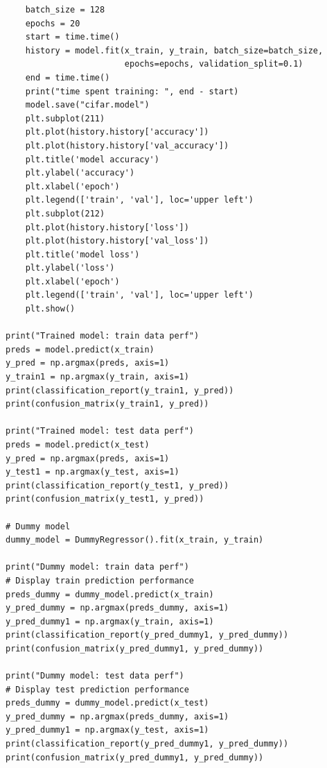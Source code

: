 \documentclass[10pt]{article}
\begin{document}
\begin{lstlisting}
    batch_size = 128
    epochs = 20
    start = time.time()
    history = model.fit(x_train, y_train, batch_size=batch_size,
                        epochs=epochs, validation_split=0.1)
    end = time.time()
    print("time spent training: ", end - start)
    model.save("cifar.model")
    plt.subplot(211)
    plt.plot(history.history['accuracy'])
    plt.plot(history.history['val_accuracy'])
    plt.title('model accuracy')
    plt.ylabel('accuracy')
    plt.xlabel('epoch')
    plt.legend(['train', 'val'], loc='upper left')
    plt.subplot(212)
    plt.plot(history.history['loss'])
    plt.plot(history.history['val_loss'])
    plt.title('model loss')
    plt.ylabel('loss')
    plt.xlabel('epoch')
    plt.legend(['train', 'val'], loc='upper left')
    plt.show()

print("Trained model: train data perf")
preds = model.predict(x_train)
y_pred = np.argmax(preds, axis=1)
y_train1 = np.argmax(y_train, axis=1)
print(classification_report(y_train1, y_pred))
print(confusion_matrix(y_train1, y_pred))

print("Trained model: test data perf")
preds = model.predict(x_test)
y_pred = np.argmax(preds, axis=1)
y_test1 = np.argmax(y_test, axis=1)
print(classification_report(y_test1, y_pred))
print(confusion_matrix(y_test1, y_pred))

# Dummy model
dummy_model = DummyRegressor().fit(x_train, y_train)

print("Dummy model: train data perf")
# Display train prediction performance
preds_dummy = dummy_model.predict(x_train)
y_pred_dummy = np.argmax(preds_dummy, axis=1)
y_pred_dummy1 = np.argmax(y_train, axis=1)
print(classification_report(y_pred_dummy1, y_pred_dummy))
print(confusion_matrix(y_pred_dummy1, y_pred_dummy))

print("Dummy model: test data perf")
# Display test prediction performance
preds_dummy = dummy_model.predict(x_test)
y_pred_dummy = np.argmax(preds_dummy, axis=1)
y_pred_dummy1 = np.argmax(y_test, axis=1)
print(classification_report(y_pred_dummy1, y_pred_dummy))
print(confusion_matrix(y_pred_dummy1, y_pred_dummy))
\end{lstlisting}
\end{document}
